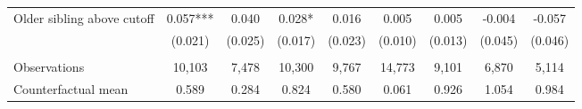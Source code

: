 {{\begin{tabular}{lcccccccc}
Older sibling above cutoff&       0.057***&       0.040   &       0.028*  &       0.016   &       0.005   &       0.005   &      -0.004   &      -0.057   \\
                    &     (0.021)   &     (0.025)   &     (0.017)   &     (0.023)   &     (0.010)   &     (0.013)   &     (0.045)   &     (0.046)   \\
                    &               &               &               &               &               &               &               &               \\
Observations        &      10,103   &       7,478   &      10,300   &       9,767   &      14,773   &       9,101   &       6,870   &       5,114   \\
Counterfactual mean &       0.589   &       0.284   &       0.824   &       0.580   &       0.061   &       0.926   &       1.054   &       0.984   \\
 

\bottomrule
\end{tabular}
}
}
